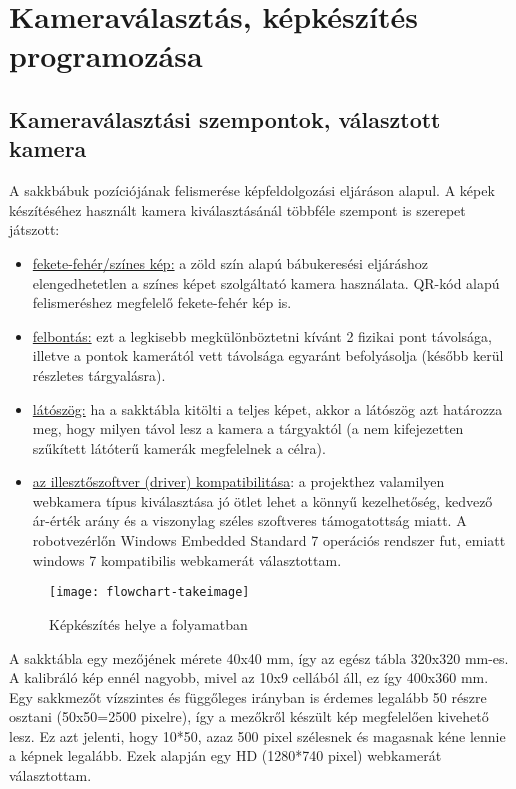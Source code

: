 \documentclass[../documentation.tex]{subfiles}
\begin{document}
\section{Kameraválasztás, képkészítés programozása}
\subsection{Kameraválasztási szempontok, választott kamera}
A sakkbábuk pozíciójának felismerése képfeldolgozási eljáráson alapul. A képek készítéséhez használt kamera kiválasztásánál többféle szempont is szerepet játszott:
\begin{itemize}
	\item \underline{fekete-fehér/színes kép:} a zöld szín alapú bábukeresési eljáráshoz elengedhetetlen a színes képet szolgáltató kamera használata. QR-kód alapú felismeréshez megfelelő fekete-fehér kép is.
	\item \underline{felbontás:} ezt a legkisebb megkülönböztetni kívánt 2 fizikai pont távolsága, illetve a pontok kamerától vett távolsága egyaránt befolyásolja (később kerül részletes tárgyalásra).
	\item \underline{látószög:} ha a sakktábla kitölti a teljes képet, akkor a látószög azt határozza meg, hogy milyen távol lesz a kamera a tárgyaktól (a nem kifejezetten szűkített látóterű kamerák megfelelnek a célra).
	\item \underline{az illesztőszoftver (driver) kompatibilitása}: a projekthez valamilyen webkamera típus kiválasztása jó ötlet lehet a könnyű kezelhetőség, kedvező ár-érték arány és a viszonylag széles szoftveres támogatottság miatt. A robotvezérlőn Windows Embedded Standard 7 operációs rendszer fut, emiatt windows 7 kompatibilis webkamerát választottam.
\end{itemize} 

\begin{figure}[h]
	\centering
	\texttt{[image: flowchart-takeimage]}
	\caption{Képkészítés helye a folyamatban}
	\label{fig:camera}
\end{figure}

A sakktábla egy mezőjének mérete 40x40 mm, így az egész tábla 320x320 mm-es. A kalibráló kép ennél nagyobb, mivel az 10x9 cellából áll, ez így 400x360 mm. Egy sakkmezőt vízszintes és függőleges irányban is érdemes legalább 50 részre osztani (50x50=2500 pixelre), így a mezőkről készült kép megfelelően kivehető lesz. Ez azt jelenti, hogy 10*50, azaz 500 pixel szélesnek és magasnak kéne lennie a képnek legalább. Ezek alapján egy HD (1280*740 pixel) webkamerát választottam. 
\end{document}
